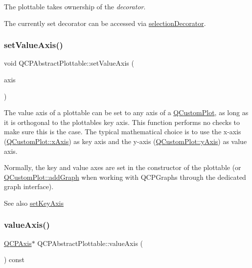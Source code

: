 The plottable takes ownership of the {\itshape decorator}.

The currently set decorator can be accessed via \mbox{\hyperlink{class_q_c_p_abstract_plottable_a7861518e47ca0c6a0c386032c2db075e}{selection\+Decorator}}. \mbox{\label{class_q_c_p_abstract_plottable_a71626a07367e241ec62ad2c34baf21cb}} 
\subsubsection{\texorpdfstring{setValueAxis()}{setValueAxis()}}
{\footnotesize\ttfamily void Q\+C\+P\+Abstract\+Plottable\+::set\+Value\+Axis (\begin{DoxyParamCaption}\item[{\mbox{\hyperlink{class_q_c_p_axis}{Q\+C\+P\+Axis}} $\ast$}]{axis }\end{DoxyParamCaption})}

The value axis of a plottable can be set to any axis of a \mbox{\hyperlink{class_q_custom_plot}{Q\+Custom\+Plot}}, as long as it is orthogonal to the plottable\textquotesingle{}s key axis. This function performs no checks to make sure this is the case. The typical mathematical choice is to use the x-\/axis (\mbox{\hyperlink{class_q_custom_plot_a9a79cd0158a4c7f30cbc702f0fd800e4}{Q\+Custom\+Plot\+::x\+Axis}}) as key axis and the y-\/axis (\mbox{\hyperlink{class_q_custom_plot_af6fea5679725b152c14facd920b19367}{Q\+Custom\+Plot\+::y\+Axis}}) as value axis.

Normally, the key and value axes are set in the constructor of the plottable (or \mbox{\hyperlink{class_q_custom_plot_a6fb2873d35a8a8089842d81a70a54167}{Q\+Custom\+Plot\+::add\+Graph}} when working with Q\+C\+P\+Graphs through the dedicated graph interface).

\begin{DoxySeeAlso}{See also}
\mbox{\hyperlink{class_q_c_p_abstract_plottable_a8524fa2994c63c0913ebd9bb2ffa3920}{set\+Key\+Axis}} 
\end{DoxySeeAlso}
\mbox{\label{class_q_c_p_abstract_plottable_af47809a644a68ffd955fb30b01fb4f2f}} 
\subsubsection{\texorpdfstring{valueAxis()}{valueAxis()}}
{\footnotesize\ttfamily \mbox{\hyperlink{class_q_c_p_axis}{Q\+C\+P\+Axis}}$\ast$ Q\+C\+P\+Abstract\+Plottable\+::value\+Axis (\begin{DoxyParamCaption}{ }\end{DoxyParamCaption}) const\hspace{0.3cm}{\ttfamily [inline]}}



